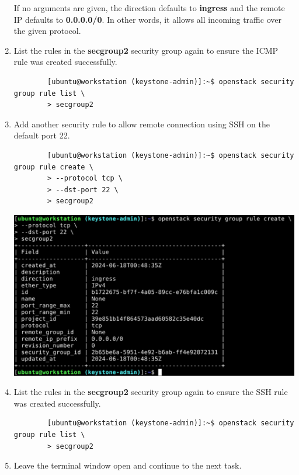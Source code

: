 \documentclass[letterpaper, 12pt]{article}
\begin{document}
\begin{enumerate}
    \begin{notebox}
        If no arguments are given, the direction defaults to \textbf{ingress} and the remote IP defaults to
        \textbf{0.0.0.0/0}. In other words, it allows all incoming traffic over the given protocol.
    \end{notebox}

    \item List the rules in the \textbf{secgroup2} security group again to ensure the ICMP rule was created
    successfully.
    \begin{lstlisting}
        [ubuntu@workstation (keystone-admin)]:~$ openstack security group rule list \
        > secgroup2
    \end{lstlisting}

    \item Add another security rule to allow remote connection using SSH on the default port 22.
    \begin{lstlisting}
        [ubuntu@workstation (keystone-admin)]:~$ openstack security group rule create \
        > --protocol tcp \
        > --dst-port 22 \
        > secgroup2
    \end{lstlisting}

    \begin{center}
        \includegraphics[width=\linewidth]{images/part5/step16.png}
    \end{center}

    \item List the rules in the \textbf{secgroup2} security group again to ensure the SSH rule was created
    successfully.
    \begin{lstlisting}
        [ubuntu@workstation (keystone-admin)]:~$ openstack security group rule list \
        > secgroup2
    \end{lstlisting}

    \item Leave the terminal window open and continue to the next task.

\end{enumerate}
\end{document}
